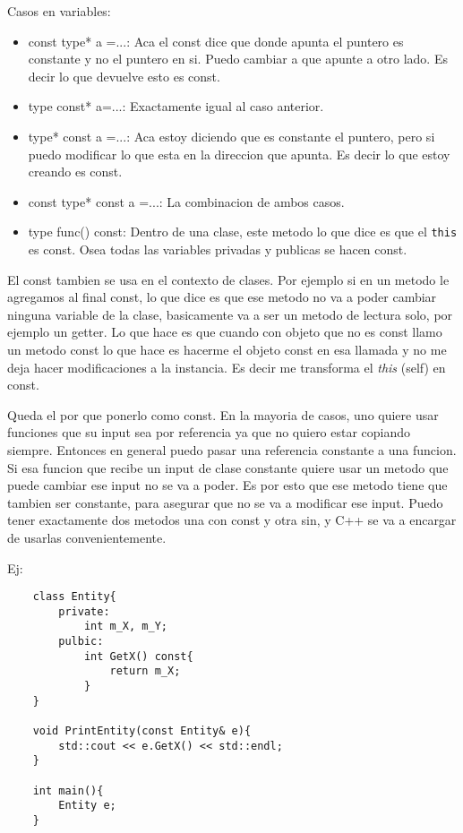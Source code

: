 \documentclass[11pt]{article}
\begin{document}
Casos en variables:
\begin{itemize}
    \item const type* a =...: Aca el const dice que donde apunta el puntero es constante
            y no el puntero en si. Puedo cambiar a que apunte a otro lado.
            Es decir lo que devuelve esto es const.
    \item type const* a=...: Exactamente igual al caso anterior.
    \item type* const a =...: Aca estoy diciendo que es constante el puntero, pero si
        puedo modificar lo que esta en la direccion que apunta.
        Es decir lo que estoy creando es const.
    \item const type* const a =...: La combinacion de ambos casos.
    \item type func() const: Dentro de una clase, este metodo lo que dice es que
        el \texttt{this} es const. Osea todas las variables privadas y publicas
        se hacen const.
\end{itemize}

El const tambien se usa en el contexto de clases.
Por ejemplo si en un metodo le agregamos al final const, lo que dice es que ese
metodo no va a poder cambiar ninguna variable de la clase, basicamente va a ser
un metodo de lectura solo, por ejemplo un getter.
Lo que hace es que cuando con objeto que no es const llamo un metodo const lo que hace
es hacerme el objeto const en esa llamada y no me deja hacer modificaciones
a la instancia.
Es decir me transforma el \textit{this} (self)  en const.

Queda el por que ponerlo como const.
En la mayoria de casos, uno quiere usar funciones que su input sea por referencia
ya que no quiero estar copiando siempre.
Entonces en general puedo pasar una referencia constante a una funcion.
Si esa funcion que recibe un input de clase constante quiere usar un metodo
que puede cambiar ese input no se va a poder.
Es por esto que ese metodo tiene que tambien ser constante, para asegurar
que no se va a modificar ese input.
Puedo tener exactamente dos metodos una con const y otra sin, y C++
se va a encargar de usarlas convenientemente.

Ej:
\begin{lstlisting}
    class Entity{
        private:
            int m_X, m_Y;
        pulbic:
            int GetX() const{
                return m_X;
            }
    }

    void PrintEntity(const Entity& e){
        std::cout << e.GetX() << std::endl;
    }

    int main(){
        Entity e;
    }
\end{lstlisting}
\end{document}
